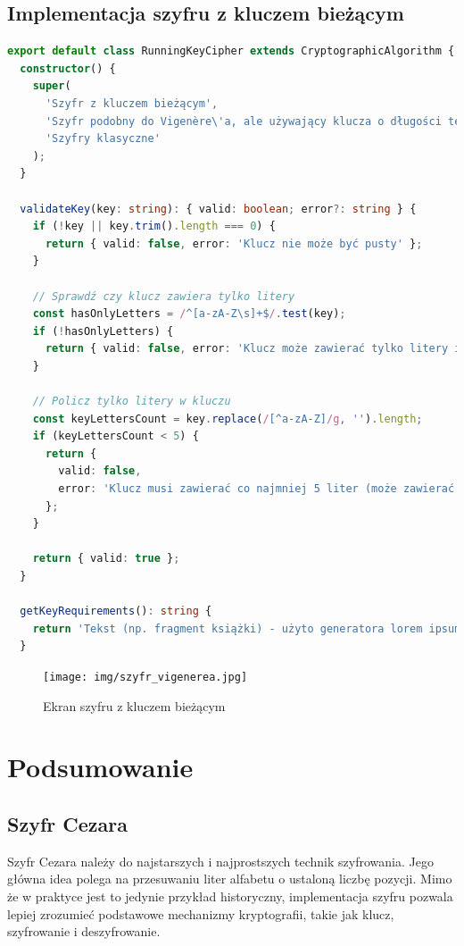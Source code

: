 \documentclass[12pt,a4paper]{article}
\begin{document}
\subsection{Implementacja szyfru z kluczem bieżącym}
\begin{lstlisting}[language=TypeScript, caption={Fragmenty klasy RunningKeyCipher}]
export default class RunningKeyCipher extends CryptographicAlgorithm {
  constructor() {
    super(
      'Szyfr z kluczem bieżącym',
      'Szyfr podobny do Vigenère\'a, ale używający klucza o długości tekstu',
      'Szyfry klasyczne'
    );
  }

  validateKey(key: string): { valid: boolean; error?: string } {
    if (!key || key.trim().length === 0) {
      return { valid: false, error: 'Klucz nie może być pusty' };
    }
    
    // Sprawdź czy klucz zawiera tylko litery
    const hasOnlyLetters = /^[a-zA-Z\s]+$/.test(key);
    if (!hasOnlyLetters) {
      return { valid: false, error: 'Klucz może zawierać tylko litery i spacje (A-Z, a-z)' };
    }
    
    // Policz tylko litery w kluczu
    const keyLettersCount = key.replace(/[^a-zA-Z]/g, '').length;
    if (keyLettersCount < 5) {
      return { 
        valid: false, 
        error: 'Klucz musi zawierać co najmniej 5 liter (może zawierać spacje)' 
      };
    }
    
    return { valid: true };
  }

  getKeyRequirements(): string {
    return 'Tekst (np. fragment książki) - użyto generatora lorem ipsum do stworzenia klucza';
  }
\end{lstlisting}
\begin{figure}[H]
    \centering
    \texttt{[image: img/szyfr\_vigenerea.jpg]}
    \caption{Ekran szyfru z kluczem bieżącym}
\end{figure}

\newpage
\section{Podsumowanie}

\subsection{Szyfr Cezara}
Szyfr Cezara należy do najstarszych i najprostszych technik szyfrowania. 
Jego główna idea polega na przesuwaniu liter alfabetu o ustaloną liczbę pozycji. 
Mimo że w praktyce jest to jedynie przykład historyczny, implementacja szyfru pozwala lepiej zrozumieć podstawowe mechanizmy kryptografii, takie jak klucz, szyfrowanie i deszyfrowanie.
\end{document}
